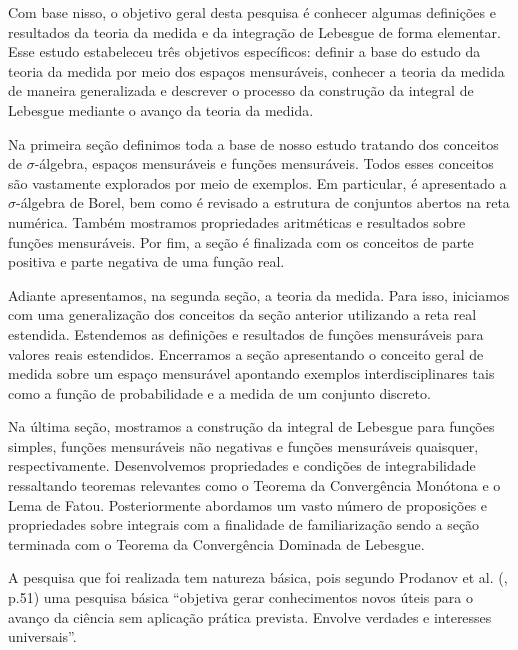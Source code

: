     Com base nisso, o objetivo geral desta pesquisa é conhecer algumas definições e resultados da teoria da medida e da integração de Lebesgue de forma elementar.
    Esse estudo estabeleceu três objetivos específicos: 
    definir a base do estudo da teoria da medida por meio dos espaços mensuráveis,
    conhecer a teoria da medida de maneira generalizada e descrever o processo da construção da integral de Lebesgue mediante o avanço da teoria da medida.
    
  	
  	Na primeira seção definimos toda a base de nosso estudo tratando dos conceitos de $\sigma$-álgebra, espaços mensuráveis e funções mensuráveis.
  	Todos esses conceitos são vastamente explorados por meio de exemplos.
  	Em particular, é apresentado a $\sigma$-álgebra de Borel, bem como é revisado a estrutura de conjuntos abertos na reta numérica.
  	Também mostramos propriedades aritméticas e resultados sobre funções mensuráveis.
  	Por fim, a seção é finalizada com os conceitos de parte positiva e parte negativa de uma função real.
  	
  	Adiante apresentamos, na segunda seção, a teoria da medida. 
  	Para isso, iniciamos com uma generalização dos conceitos da seção anterior utilizando a reta real estendida.
  	Estendemos as definições e resultados de funções mensuráveis para valores reais estendidos.
  	Encerramos a seção apresentando o conceito geral de medida sobre um espaço mensurável apontando exemplos interdisciplinares tais como a função de probabilidade e a medida de um conjunto discreto.
  	
  	Na última seção, mostramos a construção da integral de Lebesgue para funções simples, funções mensuráveis não negativas e funções mensuráveis quaisquer, respectivamente.
  	Desenvolvemos propriedades e condições de integrabilidade ressaltando teoremas relevantes como o Teorema da Convergência Monótona e o Lema de Fatou.
  	Posteriormente abordamos um vasto número de proposições e propriedades sobre integrais com a finalidade de familiarização sendo a seção terminada com o Teorema da Convergência Dominada de Lebesgue.
  	
  
  	
  	A pesquisa que foi realizada tem natureza básica, pois segundo Prodanov et al. (\citeyear{profreitas}, p.51) uma pesquisa básica
  	\enquote{objetiva gerar conhecimentos novos úteis para o avanço da ciência sem aplicação prática prevista. Envolve verdades e interesses universais}. 
  	
